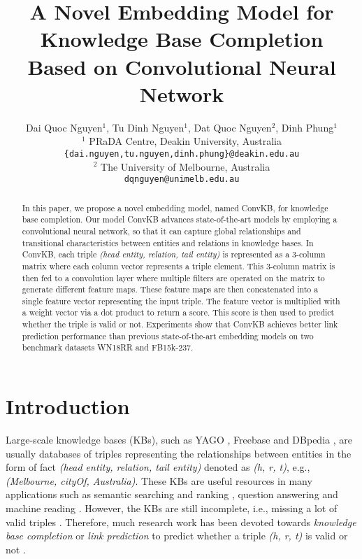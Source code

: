 \documentclass[11pt,a4paper]{article}
\title{A Novel Embedding Model for Knowledge Base Completion \\ Based on Convolutional Neural Network }
\author{
Dai Quoc Nguyen${}^{1}$, Tu Dinh Nguyen${}^{1}$, Dat Quoc Nguyen${}^{2}$, Dinh Phung${}^{1}$ \\
${}^{1}$ PRaDA Centre, Deakin University, Australia \\
{\tt{{\{dai.nguyen,tu.nguyen,dinh.phung\}@deakin.edu.au}}} \\
${}^{2 }$ The University of Melbourne, Australia \\
 {\tt{{dqnguyen@unimelb.edu.au}}}
}
\begin{document}
\maketitle

\begin{abstract}

In this paper, we propose a novel embedding model, named ConvKB, for  knowledge base completion. Our  model ConvKB advances  state-of-the-art models by employing a convolutional neural network, so that it can capture global relationships and transitional characteristics between entities and relations in  knowledge bases. In ConvKB, each  triple \textit{(head entity, relation, tail entity)} is represented as a 3-column matrix where each column vector represents a triple element. This  3-column matrix is then fed to a convolution layer where multiple filters are operated on the matrix to generate different feature maps. These feature maps are then concatenated into a single feature vector representing the input triple. The feature vector is multiplied with a weight vector via a dot product to return a score. This score is then used to predict whether the triple is valid or not. Experiments show that ConvKB achieves better link prediction performance than previous state-of-the-art embedding models on two benchmark datasets WN18RR and FB15k-237.

\end{abstract}

\section{Introduction}
Large-scale knowledge bases (KBs), such as YAGO \citep{Suchanek:2007}, Freebase \citep{Bollacker:2008} and DBpedia \citep{lehmann2015dbpedia}, are usually databases of triples representing the relationships between entities in the form of fact \textit{(head entity, relation, tail entity)} denoted as \textit{(h, r, t)}, e.g., \textit{(Melbourne, cityOf, Australia)}.    
These KBs are useful resources in many applications such as semantic searching and ranking \citep{kasneci2008naga,Schuhmacher:2014,xiong2017explicit}, question answering \citep{zhang2016question,hao2017end} and machine reading \citep{yang-mitchell:2017}. 
However, the KBs are still incomplete, i.e., missing a lot of valid triples \citep{NIPS2013_5028,West:2014}. 
Therefore, much research work has been devoted towards \textit{knowledge base completion} or \textit{link prediction}  to predict whether a triple \textit{(h, r, t)} is valid or not \citep{bordes2011learning}.
\end{document}
